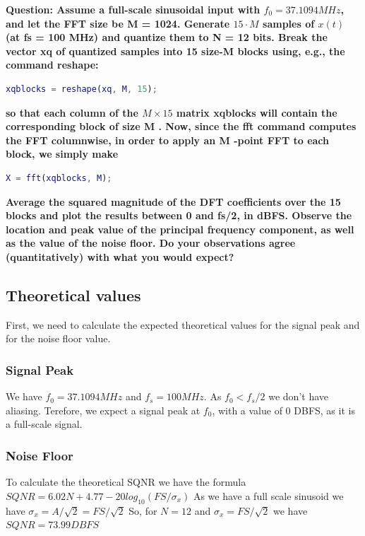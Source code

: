 \textbf{Question: Assume a full-scale sinusoidal input with $f_0 = 37.1094 MHz$, and let the FFT size be M = 1024.
    Generate $15 \cdot M$ samples of $x(t)$ (at fs = 100 MHz) and quantize them to N = 12 bits. Break
    the vector xq of quantized samples into 15 size-M blocks using, e.g., the command reshape:}

\vspace{0.5cm}

\begin{lstlisting}[language=Matlab]
    xqblocks = reshape(xq, M, 15);
\end{lstlisting}

\textbf{so that each column of the $M \times 15$ matrix xqblocks will contain the corresponding block of size
    M . Now, since the fft command computes the FFT columnwise, in order to apply an M -point
    FFT to each block, we simply make
}
\begin{lstlisting}[language=Matlab]
    X = fft(xqblocks, M);
\end{lstlisting}

\textbf{Average the squared magnitude of the DFT coefficients over the 15 blocks and plot the results
    between 0 and fs/2, in dBFS.
    Observe the location and peak value of the principal frequency component, as well as the value
    of the noise floor. Do your observations agree (quantitatively) with what you would expect?
}
\vspace{0.5cm}

\subsection{Theoretical values}
First, we need to calculate the expected theoretical values for the signal peak and for the noise floor value.
\subsubsection{Signal Peak}
We have $f_0 = 37.1094 MHz$ and $f_s = 100 MHz$. As $f_0 < f_s/2$ we don't have aliasing.
Terefore, we expect a signal peak at $f_0$, with a value of 0 DBFS, as it is a full-scale signal.

\subsubsection{Noise Floor}

To calculate the theoretical SQNR we have the formula
$SQNR = 6.02N +4.77 -20log_{10}(FS/\sigma_x)$
As we have a full scale sinusoid we have $\sigma_x = A/\sqrt{2} = FS/\sqrt{2}$
So, for $N=12$ and $\sigma_x = FS/\sqrt{2}$ we have $SQNR = 73.99 DBFS$

